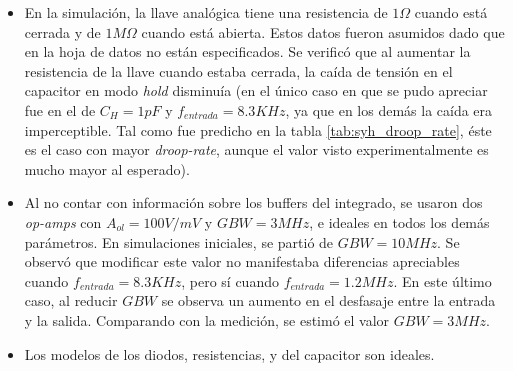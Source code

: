 \documentclass[../../ASSD_TP1_G7.tex]{subfiles}
\begin{document}
\begin{itemize}
	\item En la simulaci\'on, la llave anal\'ogica tiene una resistencia de $1\Omega$ cuando est\'a cerrada y de $1M\Omega$ cuando est\'a abierta. Estos datos fueron asumidos dado que en la hoja de datos no est\'an especificados. Se verific\'o que al aumentar la resistencia de la llave cuando estaba cerrada, la ca\'ida de tensi\'on en el capacitor en modo \textit{hold} disminu\'ia (en el \'unico caso en que se pudo apreciar fue en el de $C_H = 1pF$ y $f_{entrada} = 8.3KHz$, ya que en los dem\'as la ca\'ida era imperceptible. Tal como fue predicho en la tabla \ref{tab:syh_droop_rate}, \'este es el caso con mayor \textit{droop-rate}, aunque el valor visto experimentalmente es mucho mayor al esperado).
	\item Al no contar con informaci\'on sobre los buffers del integrado, se usaron dos \textit{op-amps} con $A_{ol} = 100V/mV$ y $GBW = 3MHz$, e ideales en todos los dem\'as par\'ametros. En simulaciones iniciales, se parti\'o de $GBW=10MHz$. Se observ\'o que modificar este valor no manifestaba diferencias apreciables cuando $f_{entrada} = 8.3KHz$, pero s\'i cuando $f_{entrada} = 1.2MHz$. En este \'ultimo caso, al reducir $GBW$ se observa un aumento en el desfasaje entre la entrada y la salida. Comparando con la medici\'on, se estim\'o el valor $GBW = 3MHz$.
 
	\item Los modelos de los diodos, resistencias, y del capacitor son ideales.
	
\end{itemize}
\end{document}
